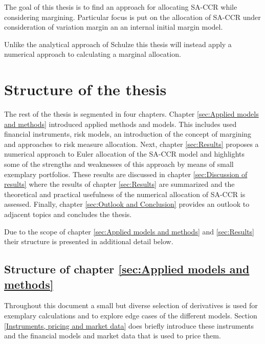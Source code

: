 \documentclass[../Thesis_AHoecherl.tex]{subfiles}
\begin{document}
    The goal of this thesis is to find an approach for allocating \gls{SA-CCR} while considering margining. Particular focus is put on the allocation of \gls{SA-CCR} under consideration of variation margin an an internal initial margin model.

    Unlike the analytical approach of Schulze \cite{schulze2018capital} this thesis will instead apply a numerical approach to calculating a marginal allocation.
    


    \section{Structure of the thesis}

    The rest of the thesis is segmented in four chapters. Chapter \ref{sec:Applied models and methods} introduced applied methods and models.
    This includes used financial instruments, risk models, an introduction of the concept of margining and approaches to risk measure allocation.
    Next, chapter \ref{sec:Results} proposes a numerical approach to Euler allocation of the \gls{SA-CCR} model and highlights some of the strengths and weaknesses of this approach by means of small exemplary portfolios.
    These results are discussed in chapter \ref{sec:Discussion of results} where the results of chapter \ref{sec:Results} are summarized and the theoretical and practical usefulness of the numerical allocation of \gls{SA-CCR} is assessed.
    Finally, chapter \ref{sec:Outlook and Conclusion} provides an outlook to adjacent topics and concludes the thesis.

    Due to the scope of chapter \ref{sec:Applied models and methods} and \ref{sec:Results} their structure is presented in additional detail below.

    \subsection{Structure of chapter \ref{sec:Applied models and methods}}

    Throughout this document a small but diverse selection of derivatives is used for exemplary calculations and to explore edge cases of the different models. Section \ref{Instruments, pricing and market data} does briefly introduce these instruments and the financial models and market data that is used to price them.
    
\end{document}
